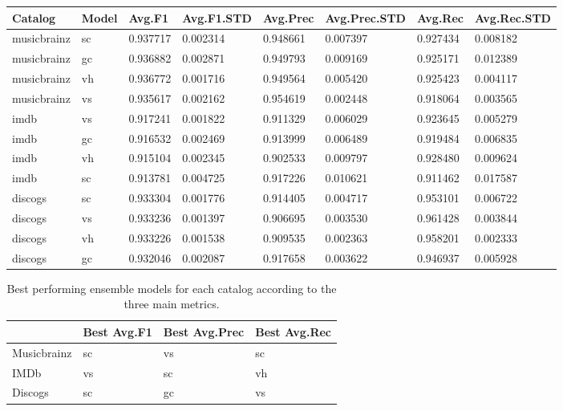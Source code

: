 \documentclass[epsfig,a4paper,11pt,titlepage,twoside,openany]{book}
\begin{document}
\begin{longtable}{|l|l|l|l|l|l|l|l|}
\hline
Catalog     & Model & Avg.F1   & Avg.F1.STD & Avg.Prec & Avg.Prec.STD & Avg.Rec  & Avg.Rec.STD \\ \hline
musicbrainz & sc    & 0.937717 & 0.002314   & 0.948661 & 0.007397     & 0.927434 & 0.008182    \\
musicbrainz & gc    & 0.936882 & 0.002871   & 0.949793 & 0.009169     & 0.925171 & 0.012389    \\
musicbrainz & vh    & 0.936772 & 0.001716   & 0.949564 & 0.005420     & 0.925423 & 0.004117    \\
musicbrainz & vs    & 0.935617 & 0.002162   & 0.954619 & 0.002448     & 0.918064 & 0.003565    \\ \hline
imdb        & vs    & 0.917241 & 0.001822   & 0.911329 & 0.006029     & 0.923645 & 0.005279    \\
imdb        & gc    & 0.916532 & 0.002469   & 0.913999 & 0.006489     & 0.919484 & 0.006835    \\
imdb        & vh    & 0.915104 & 0.002345   & 0.902533 & 0.009797     & 0.928480 & 0.009624    \\
imdb        & sc    & 0.913781 & 0.004725   & 0.917226 & 0.010621     & 0.911462 & 0.017587    \\ \hline
discogs     & sc    & 0.933304 & 0.001776   & 0.914405 & 0.004717     & 0.953101 & 0.006722    \\
discogs     & vs    & 0.933236 & 0.001397   & 0.906695 & 0.003530     & 0.961428 & 0.003844    \\
discogs     & vh    & 0.933226 & 0.001538   & 0.909535 & 0.002363     & 0.958201 & 0.002333    \\
discogs     & gc    & 0.932046 & 0.002087   & 0.917658 & 0.003622     & 0.946937 & 0.005928    \\ \hline
\end{longtable}


\begin{table}[H]
\centering
\begin{tabular}{l|l|l|l}
                                 & Best Avg.F1 & Best Avg.Prec & Best Avg.Rec \\ \hline
\multicolumn{1}{l|}{Musicbrainz} & sc          & vs            & sc           \\ \hline
\multicolumn{1}{l|}{IMDb}        & vs          & sc            & vh           \\ \hline
\multicolumn{1}{l|}{Discogs}     & sc          & gc            & vs           \\ 
\end{tabular}
\caption{Best performing ensemble models for each catalog according to the three main metrics.}
\label{tab:best-ensemble-model-per-metric-average}
\end{table}
\end{document}
